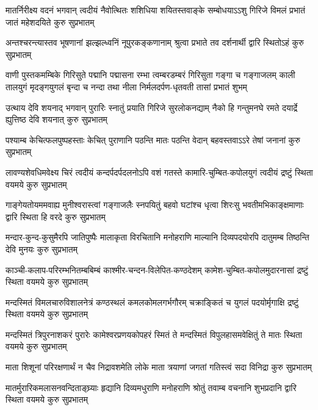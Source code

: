\fourlineindentedshloka
{मातर्निरीक्ष्य वदनं भगवान् त्वदीयं}
{नैवोत्थितः शशिधिया शयितस्तवाङ्के}
{सम्बोधयाऽऽशु गिरिजे विमलं प्रभातं}
{जातं महेशदयिते कुरु सुप्रभातम्}

\fourlineindentedshloka
{अन्तश्चरन्त्यास्तव भूषणानां}
{झल्झल्ध्वनिं नूपुरकङ्कणानाम्}
{श्रुत्वा प्रभाते तव दर्शनार्थी}
{द्वारि स्थितोऽहं कुरु सुप्रभातम्}

\fourlineindentedshloka
{वाणी पुस्तकमम्बिके गिरिसुते पद्मानि पद्मासना}
{रम्भा त्वम्बरडम्बरं गिरिसुता गङ्गा च गङ्गाजलम्}
{काली तालयुगं मृदङ्गयुगलं बृन्दा च नन्दा तथा}
{नीला निर्मलदर्पण-धृतवती तासां प्रभातं शुभम्}

\fourlineindentedshloka
{उत्थाय देवि शयनाद् भगवान् पुरारिः}
{स्नातुं प्रयाति गिरिजे सुरलोकनद्याम्}
{नैको हि गन्तुमनघे रमते दयार्द्रे}
{ह्युत्तिष्ठ देवि शयनात् कुरु सुप्रभातम्}

\fourlineindentedshloka
{पश्याम्ब केचित्फलपुष्पहस्ताः}
{केचित् पुराणानि पठन्ति मातः}
{पठन्ति वेदान् बहवस्तवाऽऽरे}
{तेषां जनानां कुरु सुप्रभातम्}

\fourlineindentedshloka
{लावण्यशेवधिमवेक्ष्य चिरं त्वदीयं}
{कन्दर्पदर्पदलनोऽपि वशं गतस्ते}
{कामारि-चुम्बित-कपोलयुगं त्वदीयं}
{द्रष्टुं स्थिता वयमये कुरु सुप्रभातम्}

\fourlineindentedshloka
{गाङ्गेयतोयममवाह्य मुनीश्वरास्त्वां}
{गङ्गाजलैः स्नपयितुं बहवो घटांश्च}
{धृत्वा शिरःसु भवतीमभिकाङ्क्षमाणाः}
{द्वारि स्थिता हि वरदे कुरु सुप्रभातम्}

\fourlineindentedshloka
{मन्दार-कुन्द-कुसुमैरपि जातिपुष्पैः}
{मालाकृता विरचितानि मनोहराणि}
{माल्यानि दिव्यपदयोरपि दातुमम्ब}
{तिष्ठन्ति देवि मुनयः कुरु सुप्रभातम्}

\fourlineindentedshloka
{काञ्ची-कलाप-परिरम्भनितम्बबिम्बं}
{काश्मीर-चन्दन-विलेपित-कण्ठदेशम्}
{कामेश-चुम्बित-कपोलमुदारनासां}
{द्रष्टुं स्थिता वयमये कुरु सुप्रभातम्}

\fourlineindentedshloka
{मन्दस्मितं विमलचारुविशालनेत्रं}
{कण्ठस्थलं कमलकोमलगर्भगौरम्}
{चक्राङ्कितं च युगलं पदयोर्मृगाक्षि}
{द्रष्टुं स्थिता वयमये कुरु सुप्रभातम्}

\fourlineindentedshloka
{मन्दस्मितं त्रिपुरनाशकरं पुरारेः}
{कामेश्वरप्रणयकोपहरं स्मितं ते}
{मन्दस्मितं विपुलहासमवेक्षितुं ते}
{मातः स्थिता वयमये कुरु सुप्रभातम्}

\fourlineindentedshloka
{माता शिशूनां परिरक्षणार्थं}
{न चैव निद्रावशमेति लोके}
{माता त्रयाणां जगतां गतिस्त्वं}
{सदा विनिद्रा कुरु सुप्रभातम्}

\fourlineindentedshloka
{मातर्मुरारिकमलासनवन्दिताङ्घ्र्याः}
{हृद्यानि दिव्यमधुराणि मनोहराणि}
{श्रोतुं तवाम्ब वचनानि शुभप्रदानि}
{द्वारि स्थिता वयमये कुरु सुप्रभातम्}

